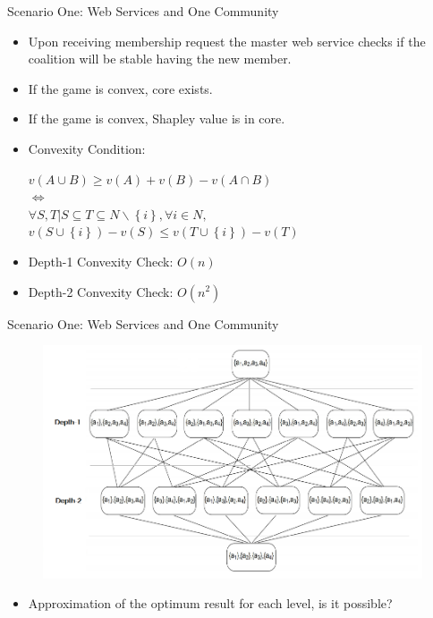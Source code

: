 \documentclass{beamer}
\begin{document}
\begin{frame}{Scenario One: Web Services and One Community}


    \begin{itemize}
        \item Upon receiving membership request the master web service checks if the coalition will be stable having the new member.
        \item If the game is convex, core exists.
        \item If the game is convex, Shapley value is in core.
        \item Convexity Condition:
        \begin{center}
          $v(A \cup B) \geq v(A) + v(B) - v(A \cap B)$ \\
          $\Leftrightarrow$  \\
          $\forall S,T | S \subseteq T \subseteq N \backslash \left\{i\right\}, \forall i \in N,$ \\
          {\color{blue} $v(S \cup \left\{i\right\}) - v(S) \leq v (T \cup \left\{i\right\}) - v(T)$ }
        \end{center}
        \item Depth-1 Convexity Check: $O(n)$
        \item Depth-2 Convexity Check: $O(n^2)$
    \end{itemize}
       	
\end{frame}

\begin{frame}{Scenario One: Web Services and One Community}

    \begin{figure}[htbp]
        \centering
        \includegraphics[width=0.92 \columnwidth]{figures/dp.png}
    \end{figure}

    \begin{itemize}
        \item Approximation of the optimum result for each level, is it possible?
    \end{itemize}
       	
\end{frame}
\end{document}
